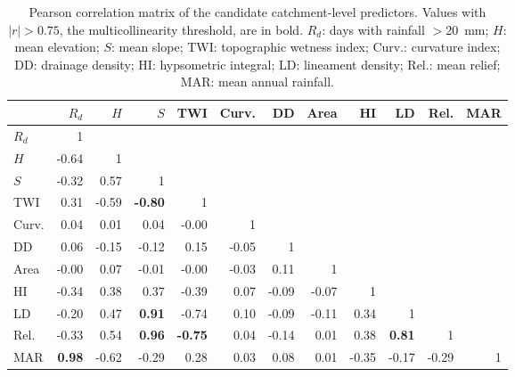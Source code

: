 \begin{table}[h]
\caption{Pearson correlation matrix of the candidate catchment-level predictors. Values with $|r| > 0.75$, the multicollinearity threshold, are in bold. $R_d$: days with rainfall $>$20~mm; $H$: mean elevation; $S$: mean slope; TWI: topographic wetness index; Curv.: curvature index; DD: drainage density; HI: hypsometric integral; LD: lineament density; Rel.: mean relief; MAR: mean annual rainfall.}\label{tabA2}
\footnotesize
\begin{tabular}{@{}lrrrrrrrrrrr@{}}
\toprule
& $R_d$ & $H$ & $S$ & TWI & Curv. & DD & Area & HI & LD & Rel. & MAR \\
\midrule
$R_d$ & 1 &  &  &  &  &  &  &  &  &  &  \\
$H$ & -0.64 & 1 &  &  &  &  &  &  &  &  &  \\
$S$ & -0.32 & 0.57 & 1 &  &  &  &  &  &  &  &  \\
TWI & 0.31 & -0.59 & \textbf{-0.80} & 1 &  &  &  &  &  &  &  \\
Curv. & 0.04 & 0.01 & 0.04 & -0.00 & 1 &  &  &  &  &  &  \\
DD & 0.06 & -0.15 & -0.12 & 0.15 & -0.05 & 1 &  &  &  &  &  \\
Area & -0.00 & 0.07 & -0.01 & -0.00 & -0.03 & 0.11 & 1 &  &  &  &  \\
HI & -0.34 & 0.38 & 0.37 & -0.39 & 0.07 & -0.09 & -0.07 & 1 &  &  &  \\
LD & -0.20 & 0.47 & \textbf{0.91} & -0.74 & 0.10 & -0.09 & -0.11 & 0.34 & 1 &  &  \\
Rel. & -0.33 & 0.54 & \textbf{0.96} & \textbf{-0.75} & 0.04 & -0.14 & 0.01 & 0.38 & \textbf{0.81} & 1 &  \\
MAR & \textbf{0.98} & -0.62 & -0.29 & 0.28 & 0.03 & 0.08 & 0.01 & -0.35 & -0.17 & -0.29 & 1 \\
\bottomrule
\end{tabular}
\end{table}
